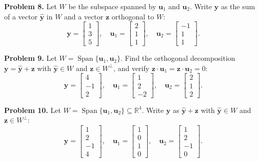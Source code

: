\documentclass[11pt, letterpaper]{article}
\theoremstyle{definition}
\theoremstyle{remark}
\newcommand{\R}{\mathbb{R}}
\begin{document}
\textbf{Problem 8.} Let $W$ be the subspace spanned by $\mathbf{u}_1$ and $\mathbf{u}_2$. Write $\mathbf{y}$ as the sum of a vector $\hat{\mathbf{y}}$ in $W$ and a vector $\mathbf{z}$ orthogonal to $W$:
\[
\mathbf{y} = \begin{bmatrix} 1 \\ 3 \\ 5 \end{bmatrix}, \quad \mathbf{u}_1 = \begin{bmatrix} 2 \\ 1 \\ 1 \end{bmatrix}, \quad \mathbf{u}_2 = \begin{bmatrix} -1 \\ 1 \\ 1 \end{bmatrix}.
\]

\textbf{Problem 9.} Let $W = \operatorname{Span}\{\mathbf{u}_1, \mathbf{u}_2\}$. Find the orthogonal decomposition $\mathbf{y} = \hat{\mathbf{y}} + \mathbf{z}$ with $\hat{\mathbf{y}} \in W$ and $\mathbf{z} \in W^\perp$, and verify $\mathbf{z} \cdot \mathbf{u}_1 = \mathbf{z} \cdot \mathbf{u}_2 = 0$:
\[
\mathbf{y} = \begin{bmatrix} 4 \\ -1 \\ 2 \end{bmatrix}, \quad \mathbf{u}_1 = \begin{bmatrix} 1 \\ 2 \\ -2 \end{bmatrix}, \quad \mathbf{u}_2 = \begin{bmatrix} 2 \\ 1 \\ 2 \end{bmatrix}.
\]

\textbf{Problem 10.} Let $W = \operatorname{Span}\{\mathbf{u}_1, \mathbf{u}_2\} \subseteq \R^4$. Write $\mathbf{y}$ as $\hat{\mathbf{y}} + \mathbf{z}$ with $\hat{\mathbf{y}} \in W$ and $\mathbf{z} \in W^\perp$:
\[
\mathbf{y} = \begin{bmatrix} 1 \\ 2 \\ -1 \\ 4 \end{bmatrix}, \quad \mathbf{u}_1 = \begin{bmatrix} 1 \\ 0 \\ 1 \\ 0 \end{bmatrix}, \quad \mathbf{u}_2 = \begin{bmatrix} 1 \\ 2 \\ -1 \\ 0 \end{bmatrix}.
\]
\end{document}
